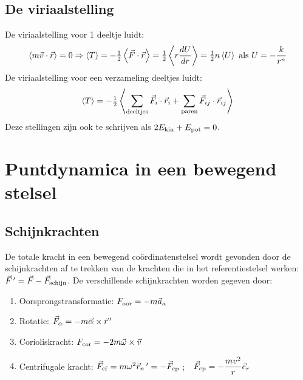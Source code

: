 \documentclass[twoside]{report}
\begin{document}
\subsection{De viriaalstelling}
De viriaalstelling voor 1 deeltje luidt:
\[
\left\langle m\vec{v}\cdot\vec{r} \right\rangle=0\Rightarrow\left\langle T \right\rangle=-\mbox{$\frac{1}{2}$}\left\langle \vec{F}\cdot\vec{r} \right\rangle=\mbox{$\frac{1}{2}$}\left\langle r\frac{dU}{dr} \right\rangle=
\mbox{$\frac{1}{2}$} n\left\langle U \right\rangle\mbox{ als } U=-\frac{k}{r^n}
\]
De viriaalstelling voor een verzameling deeltjes luidt:
\[
\left\langle T \right\rangle=-\mbox{$\frac{1}{2}$}\left\langle \sum\limits_{\rm deeltjes}\vec{F}_i\cdot\vec{r}_i+
\sum\limits_{\rm paren}\vec{F}_{ij}\cdot\vec{r}_{ij} \right\rangle
\]
Deze stellingen zijn ook te schrijven als $2E_{\rm kin}+E_{\rm pot}=0$.

\section{Puntdynamica in een bewegend stelsel}
\subsection{Schijnkrachten}
De totale kracht in een bewegend co\"ordinatenstelsel wordt gevonden door de
schijnkrachten af te trekken van de krachten die in het referentiestelsel
werken: $\vec{F}\,'=\vec{F}-\vec{F}_{\rm schijn}$. De verschillende
schijnkrachten worden gegeven door:
\begin{enumerate}
\item Oorsprongstransformatie: $F_{\rm oor}=-m\vec{a}_a$
\item Rotatie: $\vec{F}_{\alpha}=-m\vec{\alpha}\times\vec{r}\,'$
\item Corioliskracht: $F_{\rm cor}=-2m\vec{\omega}\times\vec{v}$
\item Centrifugale kracht: $\vec{F}_{\rm cf}=m\omega^2\vec{r}_n\,'=-\vec{F}_{\rm cp}$
      ;~~$\displaystyle\vec{F}_{\rm cp}=-\frac{mv^2}{r}\vec{e}_{r}$
\end{enumerate}
\end{document}
